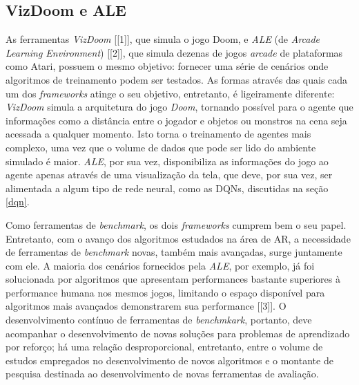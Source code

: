 \documentclass[cic,tc]{iiufrgs}
\begin{document}
\subsection{VizDoom e ALE}
\label{vizdoom_ale}
As ferramentas \textit{VizDoom} [[1]], que simula o jogo Doom, e \textit{ALE}
(de \textit{Arcade Learning Environment}) [[2]], que simula dezenas de jogos
\textit{arcade} de plataformas como Atari, possuem o mesmo objetivo: fornecer
uma série de cenários onde algoritmos de treinamento podem ser testados. As
formas através das quais cada um dos \textit{frameworks} atinge o seu objetivo,
entretanto, é ligeiramente diferente: \textit{VizDoom} simula a arquitetura do
jogo \textit{Doom}, tornando possível para o agente que informações como a
distância entre o jogador e objetos ou monstros na cena seja acessada a qualquer
momento. Isto torna o treinamento de agentes mais complexo, uma vez que o
volume de dados que pode ser lido do ambiente simulado é maior. \textit{ALE},
por sua vez, disponibiliza as informações do jogo ao agente apenas através de
uma visualização da tela, que deve, por sua vez, ser alimentada a algum tipo
de rede neural, como as DQNs, discutidas na seção \ref{dqn}.


Como ferramentas de \textit{benchmark}, os dois \textit{frameworks} cumprem bem
o seu papel. Entretanto, com o avanço dos algoritmos estudados na área de AR,
a necessidade de ferramentas de \textit{benchmark} novas, também mais avançadas,
surge juntamente com ele. A maioria dos cenários fornecidos pela \textit{ALE},
por exemplo, já foi solucionada por algoritmos que apresentam performances
bastante superiores à performance humana nos mesmos jogos, limitando o espaço
disponível para algoritmos mais avançados demonstrarem sua performance [[3]]. O
desenvolvimento contínuo de ferramentas de \textit{benchmkark}, portanto, deve
acompanhar o desenvolvimento de novas soluções para problemas de aprendizado por
reforço; há uma relação desproporcional, entretanto, entre o volume de estudos
empregados no desenvolvimento de novos algoritmos e o montante de pesquisa
destinada ao desenvolvimento de novas ferramentas de avaliação.
\end{document}
